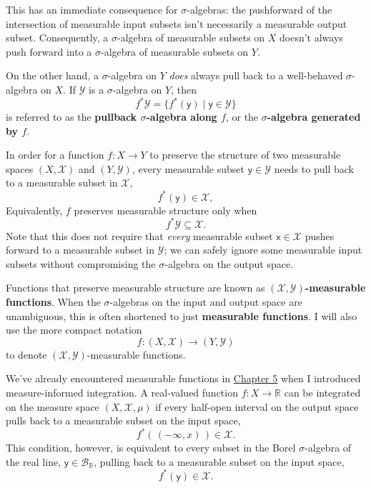 \documentclass[
  letterpaper,
  DIV=11,
  numbers=noendperiod]{scrartcl}
\begin{document}
\begin{figure}
\end{figure}%

This has an immediate consequence for \(\sigma\)-algebras: the
pushforward of the intersection of measurable input subsets isn't
necessarily a measurable output subset. Consequently, a
\(\sigma\)-algebra of measurable subsets on \(X\) doesn't always push
forward into a \(\sigma\)-algebra of measurable subsets on \(Y\).

On the other hand, a \(\sigma\)-algebra on \(Y\) \emph{does} always pull
back to a well-behaved \(\sigma\)-algebra on \(X\). If \(\mathcal{Y}\)
is a \(\sigma\)-algebra on \(Y\), then \[
f^{*} \mathcal{Y} =
\{ f^{*}(\mathsf{y}) \mid \mathsf{y} \in \mathcal{Y} \}
\] is referred to as the \textbf{pullback \(\sigma\)-algebra along
\(f\)}, or the \textbf{\(\sigma\)-algebra generated by \(f\)}.

In order for a function \(f: X \rightarrow Y\) to preserve the structure
of two measurable spaces \((X, \mathcal{X})\) and \((Y, \mathcal{Y})\),
every measurable subset \(\mathsf{y} \in \mathcal{Y}\) needs to pull
back to a measurable subset in \(\mathcal{X}\), \[
f^{*}(\mathsf{y}) \in \mathcal{X},
\] Equivalently, \(f\) preserves measurable structure only when \[
f^{*} \mathcal{Y} \subseteq \mathcal{X}.
\] Note that this does not require that \emph{every} measurable subset
\(\mathsf{x} \in \mathcal{X}\) pushes forward to a measurable subset in
\(\mathcal{Y}\); we can safely ignore some measurable input subsets
without compromising the \(\sigma\)-algebra on the output space.

Functions that preserve measurable structure are known as
\textbf{\((\mathcal{X}, \mathcal{Y})\)-measurable functions}. When the
\(\sigma\)-algebras on the input and output space are unambiguous, this
is often shortened to just \textbf{measurable functions}. I will also
use the more compact notation \[
f : (X, \mathcal{X}) \rightarrow (Y, \mathcal{Y})
\] to denote \((\mathcal{X}, \mathcal{Y})\)-measurable functions.

We've already encountered measurable functions in
\href{http://www.symplectomorphic.com/assets/chapters_html/expectation_values.html}{Chapter
5} when I introduced measure-informed integration. A real-valued
function \(f : X \rightarrow \mathbb{R}\) can be integrated on the
measure space \((X, \mathcal{X}, \mu)\) if every half-open interval on
the output space pulls back to a measurable subset on the input space,
\[
f^{*}( \, (-\infty, x) \, ) \in \mathcal{X}.
\] This condition, however, is equivalent to every subset in the Borel
\(\sigma\)-algebra of the real line,
\(\mathsf{y} \in \mathcal{B}_{\mathbb{R}}\), pulling back to a
measurable subset on the input space, \[
f^{*}( \mathsf{y} ) \in \mathcal{X}.
\]
\end{document}
